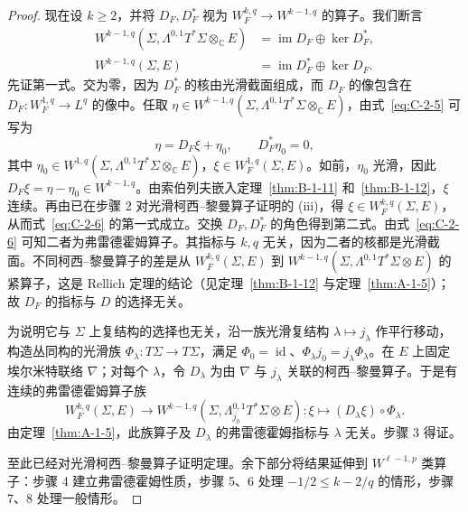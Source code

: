 \begin{proof}
现在设 $k\ge2$，并将 $D_F,D_F^*$ 视为 $W_F^{k,q}\to W^{k-1,q}$ 的算子。我们断言
\begin{equation}\label{eq:C-2-6}
\begin{aligned}
  W^{k-1,q}(\Sigma,\Lambda^{0,1}T^*\Sigma\otimes_{\mathbb C}E)
  &=\operatorname{im}D_F\oplus\ker D_F^*,\\
  W^{k-1,q}(\Sigma,E)
  &=\operatorname{im}D_F^*\oplus\ker D_F.
\end{aligned}
\end{equation}
先证第一式。交为零，因为 $D_F^*$ 的核由光滑截面组成，而 $D_F$ 的像包含在 $D_F:W_F^{1,q}\to L^q$ 的像中。任取 $\eta\in W^{k-1,q}(\Sigma,\Lambda^{0,1}T^*\Sigma\otimes_{\mathbb C}E)$，由式~\eqref{eq:C-2-5} 可写为
\[
  \eta=D_F\xi+\eta_0,\qquad D_F^*\eta_0=0,
\]
其中 $\eta_0\in W^{1,q}(\Sigma,\Lambda^{0,1}T^*\Sigma\otimes_{\mathbb C}E)$，$\xi\in W_F^{1,q}(\Sigma,E)$。如前，$\eta_0$ 光滑，因此 $D_F\xi=\eta-\eta_0\in W^{k-1,q}$。由索伯列夫嵌入定理~\ref{thm:B-1-11} 和~\ref{thm:B-1-12}，$\xi$ 连续。再由已在步骤 2 对光滑柯西–黎曼算子证明的 (iii)，得 $\xi\in W_F^{k,q}(\Sigma,E)$，从而式~\eqref{eq:C-2-6} 的第一式成立。交换 $D_F,D_F^*$ 的角色得到第二式。由式~\eqref{eq:C-2-6} 可知二者为弗雷德霍姆算子。其指标与 $k,q$ 无关，因为二者的核都是光滑截面。不同柯西–黎曼算子的差是从 $W_F^{k,q}(\Sigma,E)$ 到 $W^{k-1,q}(\Sigma,\Lambda^{0,1}T^*\Sigma\otimes E)$ 的紧算子，这是 Rellich 定理的结论（见定理~\ref{thm:B-1-12} 与定理~\ref{thm:A-1-5}）；故 $D_F$ 的指标与 $D$ 的选择无关。

为说明它与 $\Sigma$ 上复结构的选择也无关，沿一族光滑复结构 $\lambda\mapsto j_\lambda$ 作平行移动，构造丛同构的光滑族 $\Phi_\lambda:T\Sigma\to T\Sigma$，满足 $\Phi_0=\operatorname{id}$、$\Phi_\lambda j_0=j_\lambda\Phi_\lambda$。在 $E$ 上固定埃尔米特联络 $\nabla$；对每个 $\lambda$，令 $D_\lambda$ 为由 $\nabla$ 与 $j_\lambda$ 关联的柯西–黎曼算子。于是有连续的弗雷德霍姆算子族
\[
  W_F^{k,q}(\Sigma,E)
  \longrightarrow
  W^{k-1,q}(\Sigma,\Lambda^{0,1}_{j_0}T^*\Sigma\otimes E):
  \xi\longmapsto(D_\lambda\xi)\circ\Phi_\lambda.
\]
由定理~\ref{thm:A-1-5}，此族算子及 $D_\lambda$ 的弗雷德霍姆指标与 $\lambda$ 无关。步骤 3 得证。

至此已经对光滑柯西–黎曼算子证明定理。余下部分将结果延伸到 $W^{\ell-1,p}$ 类算子：步骤 4 建立弗雷德霍姆性质，步骤 5、6 处理 $-1/2\le k-2/q$ 的情形，步骤 7、8 处理一般情形。


\end{proof}
